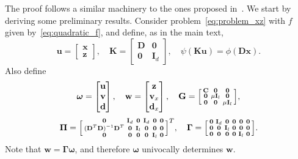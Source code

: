 \documentclass[10pt,twocolumn,twoside]{IEEEtran}
\newcommand{\x}{\mathbf{x}} %
\newcommand{\z}{\mathbf{z}} %
\newcommand{\vs}{\mathbf{v}} %
\newcommand{\dv}{\mathbf{d}} %
\newcommand{\D}{\mathbf{D}} %
\newcommand{\wt}{\mathbf{w}} %
\newcommand{\C}{\mathbf{C}} %
\newcommand{\I}{\mathbf{I}} %
\newcommand{\G}{\mathbf{G}} %
\newcommand{\K}{\mathbf{K}} %
\newcommand{\uu}{\mathbf{u}} %
\begin{document}
The proof follows a similar machinery to the ones proposed in~\cite{Chen1994, He2002, He2012a, Deng2012, Yang2011}. We start by deriving some preliminary results. Consider problem~\eqref{eq:problem_xz} with $f$ given by~\eqref{eq:quadratic_f}, and define, as in the main text,
\begin{equation*}
\uu = \begin{bmatrix}
\x \\
\z
\end{bmatrix},
\quad\K = \begin{bmatrix}
\D & \mathbf{0} \\
\mathbf{0} & \I_{d}
\end{bmatrix},
\quad
\psi (\K \uu ) = \phi(\D \x).
\end{equation*}
Also define 
\begin{equation*}
\bm{\omega} = \begin{bmatrix}\uu \\ \vs \\ \dv \end{bmatrix},
\quad \wt = \begin{bmatrix}\z \\ \vs_x \\ \dv_x \end{bmatrix},
\quad \G = \Bigl[ \begin{smallmatrix}
\C & \mathbf{0} & \mathbf{0}\\ \mathbf{0} &\mu \mathbf{I}_l & \mathbf{0}\\ \mathbf{0} & \mathbf{0}&\mu \mathbf{I}_l
\end{smallmatrix} \Bigl],
\end{equation*}
\begin{equation*}
\bm{\Pi} = \Bigl[ \begin{smallmatrix}
\mathbf{0} & \mathbf{I}_d & \mathbf{0} & \mathbf{I}_d & \mathbf{0} & \mathbf{0}\\ 
(\D^T \D)^{-1} \D^T & \mathbf{0} & \mathbf{I}_l & \mathbf{0} & \mathbf{0} & \mathbf{0}\\ 
\mathbf{0}  & \mathbf{0} & \mathbf{0} & \mathbf{0} & \mathbf{I}_l & \mathbf{0} \end{smallmatrix} \Bigl]^T,
\quad \bm{\Gamma} = \Bigl[ \begin{smallmatrix}
\mathbf{0} & \mathbf{I}_d & \mathbf{0} & \mathbf{0} & \mathbf{0} & \mathbf{0}\\ 
\mathbf{0} & \mathbf{0} & \mathbf{I}_l & \mathbf{0} & \mathbf{0} & \mathbf{0}\\ 
\mathbf{0} & \mathbf{0} & \mathbf{0} & \mathbf{0} & \mathbf{I}_l & \mathbf{0} \end{smallmatrix} \Bigl].
\end{equation*}
Note that $\wt = \bm{\Gamma} \bm{\omega}$, and therefore $\bm{\omega}$ univocally determines $\wt$.
\end{document}
